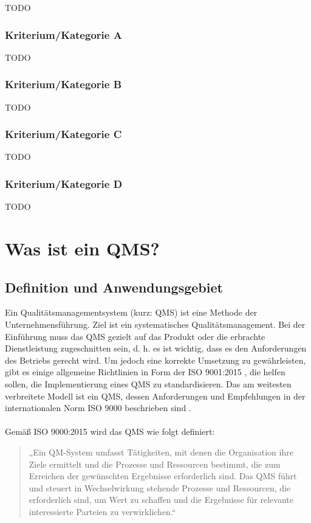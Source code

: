 \documentclass[11pt]{scrartcl}       %
\begin{document}
TODO

 

\subsubsection{Kriterium/Kategorie A}

TODO


\subsubsection{Kriterium/Kategorie B}

TODO


\subsubsection{Kriterium/Kategorie C}

TODO


\subsubsection{Kriterium/Kategorie D}

TODO

\newpage
\section{Was ist ein QMS?}
\subsection{Definition und Anwendungsgebiet}
Ein Qualitätsmanagementsystem (kurz: QMS) ist eine Methode der Unternehmensführung. Ziel ist ein systematisches Qualitätsmanagement. Bei der Einführung muss das QMS gezielt auf das Produkt oder die erbrachte Dienstleistung zugeschnitten sein, d. h. es ist wichtig, dass es den Anforderungen des Betriebs gerecht wird. Um jedoch eine korrekte Umsetzung zu gewährleisten, gibt es einige allgemeine Richtlinien in Form der ISO 9001:2015 \cite{normungsinstitut2009qualitatsmanagementsysteme}, die helfen sollen, die Implementierung eines QMS zu standardisieren. Das am weitesten verbreitete Modell ist ein QMS, dessen Anforderungen
und Empfehlungen in der internationalen Norm ISO 9000 beschrieben sind \cite{sytko2017instrumentation}. 
\\
\\
Gemäß ISO 9000:2015 \cite{din20059000} wird das QMS wie folgt definiert:\
\begin{quotation}
„Ein QM-System umfasst Tätigkeiten, mit denen die Organisation ihre Ziele ermittelt und die Prozesse und Ressourcen bestimmt, die zum Erreichen der gewünschten Ergebnisse erforderlich sind. Das QMS führt und steuert in Wechselwirkung stehende Prozesse und Ressourcen, die erforderlich sind, um Wert zu schaffen und die Ergebnisse für relevante interessierte Parteien zu verwirklichen.“
\end{quotation}
\end{document}
